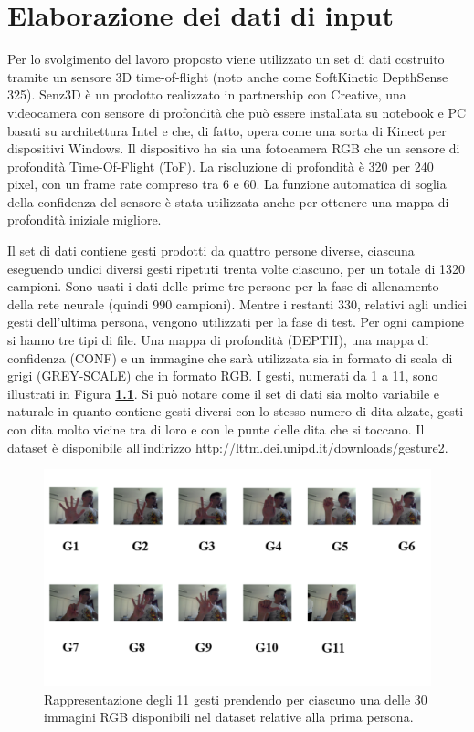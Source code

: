 \chapter{Elaborazione dei dati di input} \label{elaborazione}

Per lo svolgimento del lavoro proposto viene utilizzato un set di dati costruito tramite un sensore 3D time-of-flight (noto anche come SoftKinetic DepthSense 325).
Senz3D è un prodotto realizzato in partnership con Creative, una videocamera con sensore di profondità che può essere installata su notebook e PC basati su architettura Intel e che, di fatto, opera come una sorta di Kinect per dispositivi Windows.
Il dispositivo ha sia una fotocamera RGB che un sensore di profondità Time-Of-Flight (ToF).
La risoluzione di profondità è 320 per 240 pixel, con un frame rate compreso tra 6 e 60. La funzione automatica di soglia della confidenza del sensore è stata utilizzata anche per ottenere una mappa di profondità iniziale migliore.

Il set di dati contiene gesti prodotti da quattro persone diverse, ciascuna eseguendo undici diversi gesti ripetuti trenta volte ciascuno, per un totale di 1320 campioni. Sono usati i dati delle prime tre persone per la fase di allenamento della rete neurale (quindi 990 campioni). Mentre i restanti 330, relativi agli undici gesti dell'ultima persona, vengono utilizzati per la fase di test.
Per ogni campione si hanno tre tipi di file. Una mappa di profondità (DEPTH), una mappa di confidenza (CONF) e un immagine che sarà utilizzata sia in formato di scala di grigi (GREY-SCALE) che in formato RGB.
I gesti, numerati da 1 a 11, sono illustrati in Figura \textbf{\ref{fig:undicigesti}}. Si può notare come il set di dati sia molto variabile e naturale in quanto contiene gesti diversi con lo stesso numero di dita alzate, gesti con dita molto vicine tra di loro e con le punte delle dita che si toccano. Il dataset è disponibile all'indirizzo http://lttm.dei.unipd.it/downloads/gesture2.

\begin{figure}
\includegraphics[width=%
1\textwidth]{figures/Gesti}
\caption[Immagini RGB degli 11 gesti.]{Rappresentazione degli 11 gesti prendendo per ciascuno una delle 30 immagini RGB disponibili nel dataset relative alla prima persona.
\label{fig:undicigesti}}
\end{figure}

